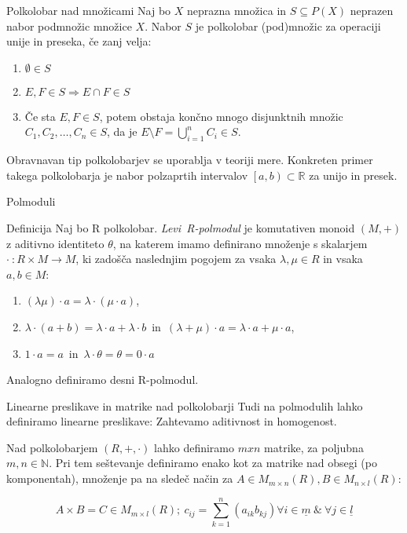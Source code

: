 \documentclass[t, 12pt]{beamer} %
\newcommand{\mth}[1]{\ensuremath{\mathbb{#1}}}
\newcommand{\R}{\mth{R}}
\newcommand{\N}{\mth{N}}
\newcommand{\pojem}[1]{\emph{#1}}
\newcommand{\map}[3]{\ensuremath{{#1}~: {#2} \rightarrow {#3}}}
\newcommand{\fillblack}[1]{
\begin{tikzpicture}[remember picture, overlay]
    \node [shift={(0 cm,0cm)}]  at (current page.south west)
        {%
        \begin{tikzpicture}[remember picture, overlay] at (current page.south west)
            \draw [fill=black] (0, 0) -- (0,#1 \paperheight) --
                              (\paperwidth,#1 \paperheight) -- (\paperwidth,0) -- cycle ;
        \end{tikzpicture}
        };
        \draw (current page.north west) rectangle (current page.south east);
\end{tikzpicture}
}
\begin{document}
\begin{frame}{Polkolobar nad množicami}
Naj bo $X$ neprazna množica in $S \subseteq P(X)$ neprazen nabor podmnožic množice $X$. Nabor $S$ je polkolobar (pod)množic za operaciji unije in preseka, če zanj velja:
\begin{enumerate}
	\item $\emptyset\in S$
	\item $E, F\in S \Rightarrow E\cap F \in S$
	\item Če sta $E, F \in S$, potem obstaja končno mnogo disjunktnih množic $C_1, C_2, \ldots, C_n \in S$, da je $E\setminus F = \bigcup_{i = 1}^{n}C_i \in S$.
\end{enumerate}

Obravnavan tip polkolobarjev se uporablja v teoriji mere. Konkreten primer takega polkolobarja je nabor polzaprtih intervalov $\left[a, b\right) \subset \R$ za unijo in presek.

\end{frame}

\begin{frame}{Polmoduli}
	\begin{block}{Definicija}
			Naj bo R polkolobar. \pojem{Levi~R-polmodul} je komutativen monoid $(M, +)$ z aditivno identiteto $\theta$, na katerem imamo definirano množenje s skalarjem \map{\cdot}{R\times M}{M}, ki zadošča naslednjim pogojem za vsaka $\lambda,\mu\in R$ in vsaka $a, b\in M$:
			\begin{enumerate}
				\item $(\lambda\mu) \cdot a = \lambda \cdot (\mu \cdot a)$,
				\item $\lambda\cdot(a + b) = \lambda\cdot a + \lambda\cdot b$~in~$(\lambda + \mu)\cdot a = \lambda\cdot a + \mu\cdot a$,
				\item $1\cdot a = a$~in~$\lambda\cdot\theta = \theta = 0\cdot a$
			\end{enumerate}
			Analogno definiramo desni R-polmodul.
	\end{block}
\end{frame}

\begin{frame}{Linearne preslikave in matrike nad polkolobarji}
	Tudi na polmodulih lahko definiramo linearne preslikave: Zahtevamo aditivnost in homogenost.
	
	Nad polkolobarjem $(R, +, \cdot)$ lahko definiramo $mxn$ matrike, za poljubna $m,n\in\N$. Pri tem seštevanje definiramo enako kot za matrike nad obsegi (po komponentah), množenje pa na sledeč način za $A\in M_{m\times n}(R), B\in M_{n\times l}(R)$:
	
	$$ 
	A\times B = C \in M_{m\times l}(R);~ c_{ij} = \sum_{k = 1}^{n}(a_{ik}b_{kj}) \forall i \in \underline{m}~\&~\forall j \in \underline{l}
	$$
	
\end{frame}
\end{document}
